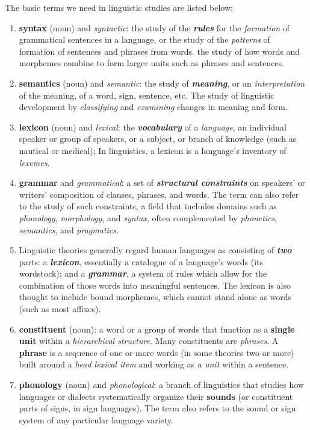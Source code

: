 \documentclass[11pt]{article}
\begin{document}
The basic terms we need in linguistic studies are listed below: 
\begin{enumerate}
\item \textbf{syntax} (noun) and \emph{syntactic}: the study of the \emph{\textbf{rules}} for the \emph{formation} of grammatical sentences in a language, or the study of the \emph{patterns} of formation of sentences and phrases from words. the study of how words and morphemes combine to form larger units such as phrases and sentences.
\item \textbf{semantics} (noun) and \emph{semantic}: the study of \emph{\textbf{meaning}}, or an \emph{interpretation} of the meaning, of a word, sign, sentence, etc. The study of linguistic development by \textit{classifying} and \emph{examining} changes in meaning and form. 
\item \textbf{lexicon} (noun) and \emph{lexical}: the \emph{\textbf{vocabulary}} of a \emph{language}, an individual speaker or group of speakers, or a subject, or branch of knowledge (such as nautical or medical);  In linguistics, a lexicon is a language's inventory of \emph{lexemes}.
\item \textbf{grammar} and \emph{grammatical}: a set of \emph{\textbf{structural constraints}} on speakers' or writers' composition of clauses, phrases, and words. The term can also refer to the study of such constraints, a field that includes domains such as \emph{phonology}, \emph{morphology}, and \emph{syntax}, often complemented by \emph{phonetics}, \emph{semantics}, and \emph{pragmatics}.
\item Linguistic theories generally regard human languages as consisting of \emph{\textbf{two}} parts: a \emph{\textbf{lexicon}}, essentially a catalogue of a language's words (its wordstock); and a \emph{\textbf{grammar}}, a system of rules which allow for the combination of those words into meaningful sentences. The lexicon is also thought to include bound morphemes, which cannot stand alone as words (such as most affixes). 
\item \textbf{constituent} (noun): a word or a group of words that function as a \textbf{single unit} within a \emph{hierarchical structure}.  Many constituents are \emph{phrases}. A \textbf{phrase} is a sequence of one or more words (in some theories two or more) built around a \emph{head lexical item} and working as \emph{a unit} within a sentence. 
\item \textbf{phonology} (noun)  and \emph{phonological}: a branch of linguistics that studies how languages or dialects systematically organize their \textbf{sounds} (or constituent parts of signs, in sign languages). The term also refers to the sound or sign system of any particular language variety. 

\end{enumerate}
\end{document}
